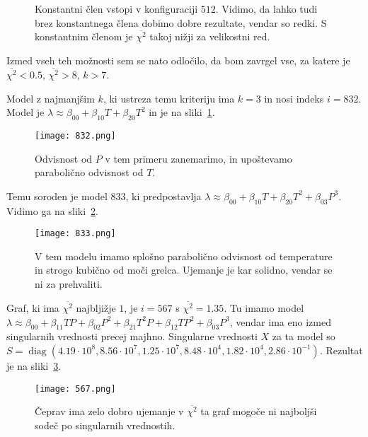 \documentclass[a4 paper, 12pt]{article}
\newcommand{\diag}{
	\operatorname{diag}
}
\begin{document}
\begin{figure}[H]\centering
	
	\caption{Konstantni \v clen vstopi v konfiguraciji $512$. Vidimo, da lahko tudi brez konstantnega \v clena dobimo
		dobre rezultate, vendar so redki. S konstantnim \v clenom je $\overline{\chi^2}$ takoj ni\v zji za
		velikostni red.}
\end{figure}
Izmed vseh teh mo\v znosti sem se nato odlo\v cilo, da bom zavrgel vse, za katere je $\overline{\chi^2} < 0.5$,
$\overline{\chi^2} > 8$, $k > 7$.

Model z najmanj\v sim $k$, ki ustreza temu kriteriju ima $k = 3$ in nosi indeks $i = 832$. Model je
$\lambda \approx \beta_{00} + \beta_{10}T + \beta_{20} T^2$ in je na sliki~\ref{najman}.
\begin{figure}[H]\centering
	\texttt{[image: 832.png]}
	\caption{Odvisnost od $P$ v tem primeru zanemarimo, in upo\v stevamo paraboli\v cno odvisnost od $T$.}
	\label{najman}
\end{figure}
Temu soroden je model $833$, ki predpostavlja $\lambda \approx \beta_{00} + \beta_{10}T + \beta_{20} T^2 + \beta_{03} P^3$.
Vidimo ga na sliki~\ref{sestra}.
\begin{figure}[H]\centering
	\texttt{[image: 833.png]}
	\caption{V tem modelu imamo splo\v sno paraboli\v cno odvisnost od temperature in strogo kubi\v cno od mo\v ci grelca.
		Ujemanje je kar solidno, vendar se ni za prehvaliti.}
	\label{sestra}
\end{figure}

Graf, ki ima $\overline{\chi^2}$ najblji\v zje $1$, je $i = 567$ s $\overline{\chi^2} = 1.35$. Tu imamo model
$\lambda \approx \beta_{00} + \beta_{11} TP + \beta_{02} P^2 + \beta_{21} T^2P + \beta_{12} TP^2 + \beta_{03} P^3$,
vendar ima eno izmed singularnih vrednosti precej majhno. Singularne vrednosti $X$ za ta model so
$S = \diag(4.19 \cdot 10^8, 8.56 \cdot 10^7, 1.25 \cdot 10^7, 8.48 \cdot 10^4, 1.82 \cdot 10^4, 2.86 \cdot 10^{-1})$.
Rezultat je na sliki~\ref{najmanjsi}.
\begin{figure}[H]\centering
	\texttt{[image: 567.png]}
	\caption{\v Ceprav ima zelo dobro ujemanje v $\overline{\chi^2}$ ta graf mogo\v ce ni najbolj\v si sode\v c
		po singularnih vrednostih.}
	\label{najmanjsi}
\end{figure}
\end{document}
